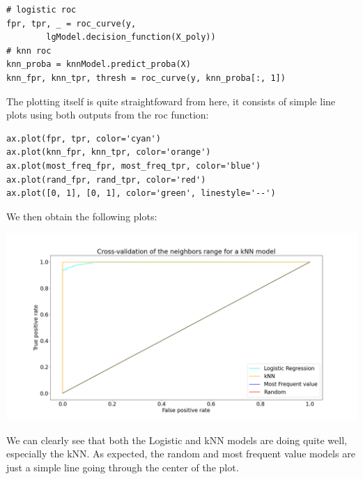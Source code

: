 \documentclass[10pt]{article}
\begin{document}
\begin{lstlisting}
# logistic roc
fpr, tpr, _ = roc_curve(y,
        lgModel.decision_function(X_poly))
# knn roc
knn_proba = knnModel.predict_proba(X)
knn_fpr, knn_tpr, thresh = roc_curve(y, knn_proba[:, 1])
\end{lstlisting}
\par
The plotting itself is quite straightfoward from here, it consists of simple
line plots using both outputs from the roc function:
\par
\begin{lstlisting}
ax.plot(fpr, tpr, color='cyan')
ax.plot(knn_fpr, knn_tpr, color='orange')
ax.plot(most_freq_fpr, most_freq_tpr, color='blue')
ax.plot(rand_fpr, rand_tpr, color='red')
ax.plot([0, 1], [0, 1], color='green', linestyle='--')
\end{lstlisting}
We then obtain the following plots:
\begin{center}
    \includegraphics[scale=0.25]{roc.png}
\end{center}
\vspace{5mm} %

We can clearly see that both the Logistic and kNN models are doing quite well, especially the kNN.
As expected, the random and most frequent value models are just a simple line going through the
center of the plot.
\end{document}
